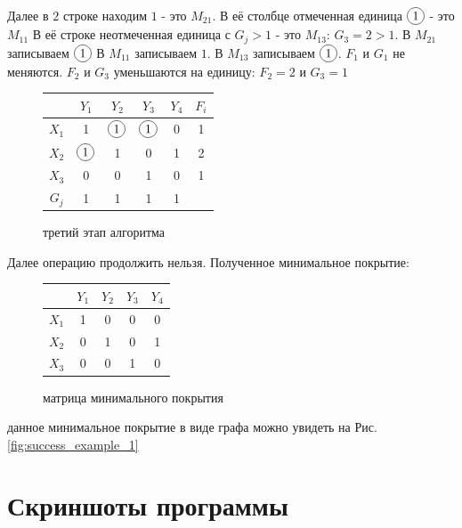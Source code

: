 \documentclass[12pt]{article}
\newcommand*\circled[1]{\tikz[baseline=(char.base)]{
            \node[shape=circle,draw,inner sep=2pt] (char) {#1};}}
\begin{document}
Далее в $2$ строке находим $1$ - это $M_{21}$. В её
столбце отмеченная единица $\circled{1}$ - это $M_{11}$
В её строке неотмеченная единица с $G_j > 1$ - это $M_{13}$:
$G_3 = 2 > 1$. В $M_{21}$ записываем $\circled{1}$ В $M_{11}$
записываем $1$. В $M_{13}$ записываем $\circled{1}$.
$F_1$ и $G_1$ не меняются. $F_2$ и $G_3$ уменьшаются на единицу:
$F_2 = 2$ и $G_3 = 1$

\begin{figure}[H]
    \centering
    \begin{tabular}{ c|c|c|c|c|c }
              & $Y_1$         & $Y_2$         & $Y_3$         & $Y_4$ & $F_i$ \\
        \hline
        $X_1$ & 1             & $\circled{1}$ & $\circled{1}$ & 0     & 1     \\
        \hline
        $X_2$ & $\circled{1}$ & 1             & 0             & 1     & 2     \\
        \hline
        $X_3$ & 0             & 0             & 1             & 0     & 1     \\
        \hline
        $G_j$ & 1             & 1             & 1             & 1     &
    \end{tabular}
    \label{fig:third_step_complete}
    \caption{третий этап алгоритма}
\end{figure}

Далее операцию продолжить нельзя. Полученное минимальное покрытие:

\begin{figure}[H]
    \centering
    \begin{tabular}{ c|c|c|c|c| }
              & $Y_1$ & $Y_2$ & $Y_3$ & $Y_4$ \\
        \hline
        $X_1$ & 1     & 0     & 0     & 0     \\
        \hline
        $X_2$ & 0     & 1     & 0     & 1     \\
        \hline
        $X_3$ & 0     & 0     & 1     & 0     \\
        \hline
    \end{tabular}
    \label{fig:finished_coverage}
    \caption{матрица минимального покрытия}
\end{figure}

данное минимальное покрытие в виде графа можно увидеть на
Рис. \ref{fig:success_example_1}

\section{Скриншоты программы}
\end{document}
